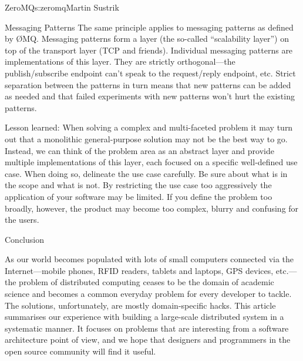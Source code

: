 \begin{aosachapter}{ZeroMQ}{s:zeromq}{Martin Sustrik}
\begin{aosasect1}{Messaging Patterns}
The same principle applies to messaging patterns as defined by
{\O}MQ. Messaging patterns form a layer (the so-called ``scalability layer'')
on top of the transport layer (TCP and friends). Individual messaging
patterns are implementations of this layer. They are strictly
orthogonal---the publish/subscribe endpoint can't speak to the request/reply
endpoint, etc. Strict separation between the patterns in turn means
that new patterns can be added as needed and that failed experiments
with new patterns won't hurt the existing patterns.

Lesson learned: When solving a complex and multi-faceted problem it
may turn out that a monolithic general-purpose solution may not be the
best way to go. Instead, we can think of the problem area as an
abstract layer and provide multiple implementations of this layer,
each focused on a specific well-defined use case. When doing so,
delineate the use case carefully. Be sure about what is in the scope
and what is not. By restricting the use case too aggressively the
application of your software may be limited. If you define the problem
too broadly, however, the product may become too complex, blurry and
confusing for the users.

\end{aosasect1}

\begin{aosasect1}{Conclusion}

As our world becomes populated with lots of small computers connected
via the Internet---mobile phones, RFID readers, tablets and
laptops, GPS devices, etc.---the problem of distributed computing ceases
to be the domain of academic science and becomes a common everyday
problem for every developer to tackle. The solutions, unfortunately,
are mostly domain-specific hacks. This article summarises our
experience with building a large-scale distributed system in a
systematic manner. It focuses on problems that are interesting from
a software architecture point of view, and we hope that designers and
programmers in the open source community will find it useful.

\end{aosasect1}

\end{aosachapter}
